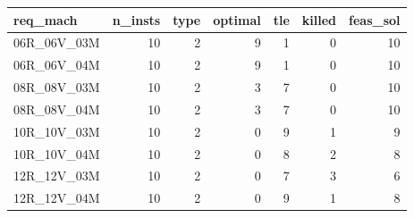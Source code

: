 
\begin{tabular}{lrrrrrr}
\toprule
req\_mach & n\_insts & type & optimal & tle & killed & feas\_sol\\
\midrule
06R\_06V\_03M & 10 & 2 & 9 & 1 & 0 & 10\\
06R\_06V\_04M & 10 & 2 & 9 & 1 & 0 & 10\\
08R\_08V\_03M & 10 & 2 & 3 & 7 & 0 & 10\\
08R\_08V\_04M & 10 & 2 & 3 & 7 & 0 & 10\\
10R\_10V\_03M & 10 & 2 & 0 & 9 & 1 & 9\\
\addlinespace
10R\_10V\_04M & 10 & 2 & 0 & 8 & 2 & 8\\
12R\_12V\_03M & 10 & 2 & 0 & 7 & 3 & 6\\
12R\_12V\_04M & 10 & 2 & 0 & 9 & 1 & 8\\
\bottomrule
\end{tabular}

